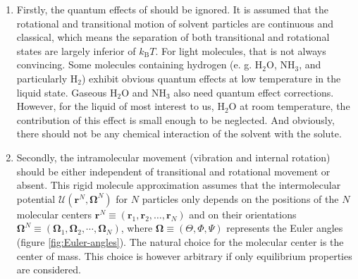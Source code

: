 \begin{enumerate}
\item Firstly, the quantum effects of should be ignored. It is assumed that
the rotational and transitional motion of solvent particles are continuous
and classical, which means the separation of both transitional and
rotational states are largely inferior of $k_{\mathrm{B}}T$. For
light molecules, that is not always convincing. Some molecules containing
hydrogen (e. g. $\mathrm{H_{2}O}$, $\mathrm{NH_{3}}$, and particularly
$\mathrm{H_{2}}$) exhibit obvious quantum effects at low temperature
in the liquid state. Gaseous $\mathrm{H_{2}O}$ and $\mathrm{NH_{3}}$
also need quantum effect corrections. However, for the liquid of most
interest to us, $\mathrm{H_{2}O}$ at room temperature, the contribution
of this effect is small enough to be neglected. And obviously, there
should not be any chemical interaction of the solvent with the solute.
\item Secondly, the intramolecular movement (vibration and internal rotation) should
be either independent of transitional and rotational movement or absent.
This rigid molecule approximation assumes that the intermolecular
potential $\mathcal{U}(\mathbf{r}^{N},\mathbf{\Omega}^{N})$ for $N$
particles only depends on the positions of the $N$ molecular centers
$\mathbf{r}^{N}\equiv(\mathbf{r}_{1},\mathbf{r}_{2},\ldots,\mathbf{r}_{N})$
and on their orientations $\mathbf{\Omega}^{N}\equiv(\mathbf{\Omega}_{1},\mathbf{\Omega}_{2},\cdots,\mathbf{\Omega}_{N})$,
where $\mathbf{\Omega}\equiv(\Theta,\Phi,\Psi)$ represents the Euler
angles (figure \ref{fig:Euler-angles}). The natural choice for the
molecular center is the center of mass. This choice is however arbitrary
if only equilibrium properties are considered.


\end{enumerate}
